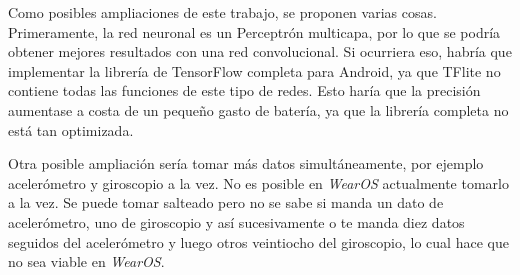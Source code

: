 \documentclass[12pt]{book}
\numberwithin{equation}{section}
\begin{document}
Como posibles ampliaciones de este trabajo, se proponen varias cosas. Primeramente, la red neuronal es un Perceptrón multicapa, por lo que se podría obtener mejores resultados con una red convolucional. Si ocurriera eso, habría que implementar la librería de TensorFlow completa para Android, ya que TFlite no contiene todas las funciones de este tipo de redes. Esto haría que la precisión aumentase a costa de un pequeño gasto de batería, ya que la librería completa no está tan optimizada.

Otra posible ampliación sería tomar más datos simultáneamente, por ejemplo acelerómetro y giroscopio a la vez. No es posible en \textit{WearOS} actualmente tomarlo a la vez. Se puede tomar salteado pero no se sabe si manda un dato de acelerómetro, uno de giroscopio y así sucesivamente o te manda diez datos seguidos del acelerómetro y luego otros veintiocho del giroscopio, lo cual hace que no sea viable en \textit{WearOS}.




\nocite{*}


\end{document}
